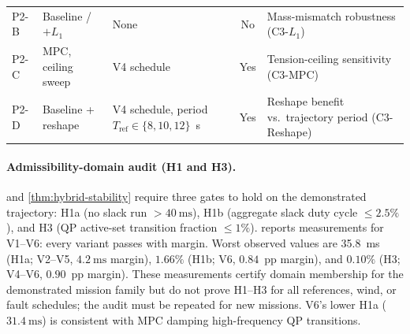 \begin{table}[htbp]
\begin{tabular}{llp{5.5cm}cp{5cm}}
    P2-B & Baseline / $+L_1$    & None                                                                                  & No   & Mass-mismatch robustness (C3-$L_1$) \\
    P2-C & MPC, ceiling sweep   & V4 schedule                                                                           & Yes  & Tension-ceiling sensitivity (C3-MPC) \\
    P2-D & Baseline + reshape   & V4 schedule, period $T_{\mathrm{ref}} \in \{8,10,12\}$~s                              & Yes  & Reshape benefit vs.\ trajectory period (C3-Reshape) \\
    \bottomrule
  \end{tabular}
\end{table}

\paragraph{Admissibility-domain audit (H1 and H3).}  and \cref{thm:hybrid-stability} require three gates to hold on the demonstrated trajectory: H1a (no slack run $> \SI{40}{\milli\second}$), H1b (aggregate slack duty cycle $\le 2.5\%$), and H3 (QP active-set transition fraction $\le 1\%$).  reports measurements for V1--V6: every variant passes with margin. Worst observed values are \SI{35.8}{\milli\second} (H1a; V2--V5, $\SI{4.2}{\milli\second}$ margin), $1.66\%$ (H1b; V6, $0.84$~pp margin), and $0.10\%$ (H3; V4--V6, $0.90$~pp margin). These measurements certify domain membership for the demonstrated mission family but do not prove H1--H3 for all references, wind, or fault schedules; the audit must be repeated for new missions. V6's lower H1a ($\SI{31.4}{\milli\second}$) is consistent with MPC damping high-frequency QP transitions.

